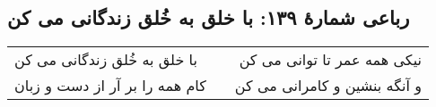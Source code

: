 \begin{center}
\section*{رباعی شمارهٔ ۱۳۹: با خلق به خُلق زندگانی می کن}
\label{sec:139}
\begin{longtable}{l p{0.5cm} r}
با خلق به خُلق زندگانی می کن
&&
نیکی همه عمر تا توانی می کن
\\
کام همه را بر آر از دست و زبان
&&
و آنگه بنشین و کامرانی می کن
\\
\end{longtable}
\end{center}
